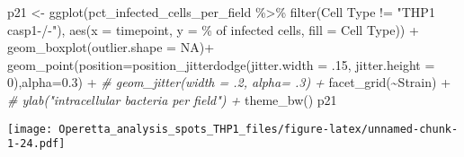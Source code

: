 \documentclass[
]{article}
\newenvironment{Shaded}{\begin{snugshade}}{\end{snugshade}}
\newcommand{\AttributeTok}[1]{\textcolor[rgb]{0.77,0.63,0.00}{#1}}
\newcommand{\CommentTok}[1]{\textcolor[rgb]{0.56,0.35,0.01}{\textit{#1}}}
\newcommand{\ConstantTok}[1]{\textcolor[rgb]{0.00,0.00,0.00}{#1}}
\newcommand{\DecValTok}[1]{\textcolor[rgb]{0.00,0.00,0.81}{#1}}
\newcommand{\FloatTok}[1]{\textcolor[rgb]{0.00,0.00,0.81}{#1}}
\newcommand{\FunctionTok}[1]{\textcolor[rgb]{0.00,0.00,0.00}{#1}}
\newcommand{\NormalTok}[1]{#1}
\newcommand{\OtherTok}[1]{\textcolor[rgb]{0.56,0.35,0.01}{#1}}
\newcommand{\SpecialCharTok}[1]{\textcolor[rgb]{0.00,0.00,0.00}{#1}}
\newcommand{\StringTok}[1]{\textcolor[rgb]{0.31,0.60,0.02}{#1}}
\begin{document}
\begin{Shaded}
\begin{Highlighting}[]
\NormalTok{p21 }\OtherTok{\textless{}{-}} \FunctionTok{ggplot}\NormalTok{(pct\_infected\_cells\_per\_field }\SpecialCharTok{\%\textgreater{}\%}
                \FunctionTok{filter}\NormalTok{(}\StringTok{\textasciigrave{}}\AttributeTok{Cell Type}\StringTok{\textasciigrave{}} \SpecialCharTok{!=} \StringTok{"THP1 casp1{-}/{-}"}\NormalTok{), }\FunctionTok{aes}\NormalTok{(}\AttributeTok{x =}\NormalTok{ timepoint, }\AttributeTok{y =} \StringTok{\textasciigrave{}}\AttributeTok{\% of infected cells}\StringTok{\textasciigrave{}}\NormalTok{, }\AttributeTok{fill =} \StringTok{\textasciigrave{}}\AttributeTok{Cell Type}\StringTok{\textasciigrave{}}\NormalTok{)) }\SpecialCharTok{+}
  \FunctionTok{geom\_boxplot}\NormalTok{(}\AttributeTok{outlier.shape =} \ConstantTok{NA}\NormalTok{)}\SpecialCharTok{+}
  \FunctionTok{geom\_point}\NormalTok{(}\AttributeTok{position=}\FunctionTok{position\_jitterdodge}\NormalTok{(}\AttributeTok{jitter.width =}\NormalTok{ .}\DecValTok{15}\NormalTok{, }\AttributeTok{jitter.height =} \DecValTok{0}\NormalTok{),}\AttributeTok{alpha=}\FloatTok{0.3}\NormalTok{) }\SpecialCharTok{+}
  \CommentTok{\#  geom\_jitter(width = .2, alpha= .3) +}
  \FunctionTok{facet\_grid}\NormalTok{(}\SpecialCharTok{\textasciitilde{}}\NormalTok{Strain) }\SpecialCharTok{+}
  \CommentTok{\#  ylab("intracellular bacteria per field") +}
  \FunctionTok{theme\_bw}\NormalTok{()}
\NormalTok{p21}
\end{Highlighting}
\end{Shaded}

\texttt{[image: Operetta\_analysis\_spots\_THP1\_files/figure-latex/unnamed-chunk-1-24.pdf]}
\end{document}
